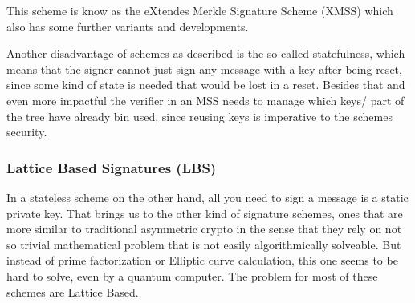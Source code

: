 \documentclass[conference]{IEEEtran}
\begin{document}
This scheme is know as the eXtendes Merkle Signature Scheme (XMSS) which also has some further variants and developments. \cite{QR_IoT }

Another disadvantage of schemes as described is the so-called statefulness, which means that the signer cannot just sign any message with a key after being reset, since some kind of state is needed that would be lost in a reset. \cite{QR_sigs} 
Besides that and even more impactful the verifier in an MSS needs to manage which keys/ part of the tree have already bin used, since reusing keys is imperative to the schemes security.

\subsubsection{Lattice Based Signatures (LBS)}\label{LBS}
In a stateless scheme on the other hand, all you need to sign a message is a static private key.
That brings us to the other kind of signature schemes, ones that are more similar to traditional asymmetric crypto in the sense that they rely on not so trivial mathematical problem that is not easily algorithmically solveable. But instead of prime factorization or Elliptic curve calculation, this one seems to be hard to solve, even by a quantum computer. The problem for most of these schemes are Lattice Based.
\end{document}
